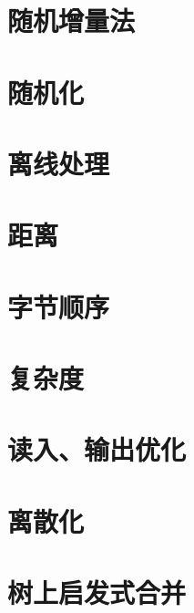 \section{随机增量法}

\section{随机化}

\section{离线处理}

\section{距离}

\section{字节顺序}

\section{复杂度}

\section{读入、输出优化}

\section{离散化}

\section{树上启发式合并}

\cleardoublepage
\backmatter


